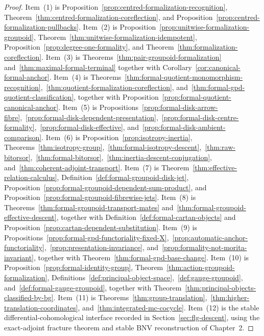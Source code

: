 \begin{proof}
Item~(1) is
Proposition~\ref{prop:centred-formalization-recognition},
Theorem~\ref{thm:centred-formalization-coreflection}, and
Proposition~\ref{prop:centred-formalization-pullbacks}.
Item~(2) is
Proposition~\ref{prop:unitwise-formalization-groupoid},
Theorem~\ref{thm:unitwise-formalization-idempotent},
Proposition~\ref{prop:degree-one-formality}, and
Theorem~\ref{thm:formalization-coreflection}.
Item~(3) is
Theorems~\ref{thm:pair-groupoid-formalization} and~\ref{thm:maximal-formal-terminal} together with
Corollary~\ref{cor:canonical-formal-anchor}.
Item~(4) is
Theorems~\ref{thm:formal-quotient-monomorphism-recognition},~\ref{thm:quotient-formalization-coreflection}, and~\ref{thm:formal-gpd-quotient-classification}, together with
Proposition~\ref{prop:formal-quotient-canonical-anchor}.
Item~(5) is
Propositions~\ref{prop:formal-disk-arrow-fibre},~\ref{prop:formal-disk-dependent-presentation},~\ref{prop:formal-disk-centre-formality},~\ref{prop:formal-disk-effective}, and~\ref{prop:formal-disk-ambient-comparison}.
Item~(6) is
Proposition~\ref{prop:isotropy-inertia},
Theorems~\ref{thm:isotropy-group},~\ref{thm:formal-isotropy-descent},~\ref{thm:raw-bitorsor},~\ref{thm:formal-bitorsor},~\ref{thm:inertia-descent-conjugation}, and~\ref{thm:coherent-adjoint-transport}.
Item~(7) is
Theorem~\ref{thm:effective-relation-calculus},
Definition~\ref{def:formal-groupoid-disk-jet},
Proposition~\ref{prop:formal-groupoid-dependent-sum-product}, and
Proposition~\ref{prop:formal-groupoid-fibrewise-jets}.
Item~(8) is
Theorems~\ref{thm:formal-groupoid-transport-mates} and~\ref{thm:formal-groupoid-effective-descent}, together with
Definition~\ref{def:formal-cartan-objects} and
Proposition~\ref{prop:cartan-dependent-substitution}.
Item~(9) is
Propositions~\ref{prop:formal-gpd-functoriality-fixed-X},~\ref{prop:automatic-anchor-functoriality},~\ref{prop:presentation-invariance}, and~\ref{prop:formality-not-morita-invariant}, together with
Theorem~\ref{thm:formal-gpd-base-change}.
Item~(10) is
Proposition~\ref{prop:formal-identity-group},
Theorem~\ref{thm:action-groupoid-formalization},
Definitions~\ref{def:principal-object-space},~\ref{def:gauge-groupoid}, and~\ref{def:formal-gauge-groupoid}, together with
Theorem~\ref{thm:principal-objects-classified-by-bg}.
Item~(11) is
Theorems~\ref{thm:group-translation},~\ref{thm:higher-translation-coordinates}, and~\ref{thm:integrated-mc-cocycle}.
Item~(12) is the stable differential-cohomological interface recorded in
Section~\ref{sec:flg-descent}, using the exact-adjoint fracture theorem and
stable BNV reconstruction of Chapter~2.
\end{proof}


